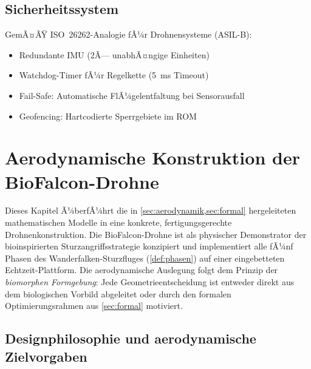 ﻿\documentclass[12pt,a4paper]{article}
\theoremstyle{remark}
\begin{document}
	\subsection{Sicherheitssystem}
	
	GemÃ¤ÃŸ ISO~26262-Analogie fÃ¼r Drohnensysteme (ASIL-B):
	\begin{itemize}
		\item Redundante IMU (2Ã— unabhÃ¤ngige Einheiten)
		\item Watchdog-Timer fÃ¼r Regelkette (\SI{5}{\ms} Timeout)
		\item Fail-Safe: Automatische FlÃ¼gelentfaltung bei Sensorausfall
		\item Geofencing: Hartcodierte Sperrgebiete im ROM
	\end{itemize}
	
	\section{Aerodynamische Konstruktion der BioFalcon-Drohne}
	\label{sec:konstruktion}
	
	Dieses Kapitel Ã¼berfÃ¼hrt die in \cref{sec:aerodynamik,sec:formal} hergeleiteten
	mathematischen Modelle in eine konkrete, fertigungsgerechte Drohnenkonstruktion.
	Die BioFalcon-Drohne ist als physischer Demonstrator der bioinspirierten
	Sturzangriffsstrategie konzipiert und implementiert alle fÃ¼nf Phasen des
	Wanderfalken-Sturzfluges (\cref{def:phasen}) auf einer eingebetteten
	Echtzeit-Plattform.  Die aerodynamische Auslegung folgt dem Prinzip der
	\emph{biomorphen Formgebung}: Jede Geometrieentscheidung ist entweder direkt aus
	dem biologischen Vorbild abgeleitet oder durch den formalen Optimierungsrahmen
	aus \cref{sec:formal} motiviert.
	
	\subsection{Designphilosophie und aerodynamische Zielvorgaben}
	\label{sec:kons_ziele}
	
\end{document}
